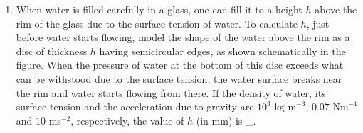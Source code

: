  \begin{enumerate}
\item When water is filled carefully in a glass, one can fill it to a height \(h\) above the rim of the glass due to the surface tension of water. To calculate \(h\), just before water starts flowing, model the shape of the water above the rim as a disc of thickness \(h\) having semicircular edges, as shown schematically in the figure. When the pressure of water at the bottom of this disc exceeds what can be withstood due to the surface tension, the water surface breaks near the rim and water starts flowing from there. If the density of water, its surface tension and the acceleration due to gravity are \(10^3\text{ kg m}^{-3}\), \(0.07\text{ Nm}^{-1}\) and \(10\text{ ms}^{-2}\), respectively, the value of \(h\) (in mm) is \_.
\end{enumerate}

\begin{center}
\end{center}